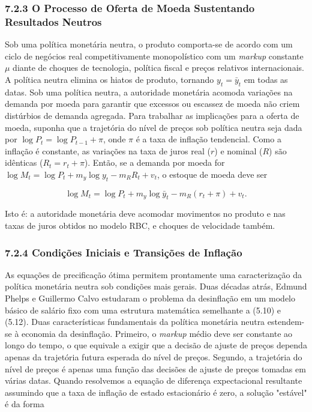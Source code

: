 \documentclass[12pt]{article}
\begin{document}
\subsubsection{7.2.3 O Processo de Oferta de Moeda Sustentando Resultados Neutros} Sob uma política monetária neutra, o produto comporta-se de acordo com um ciclo de negócios real competitivamente monopolístico com um \textit{markup} constante $\mu$ diante de choques de tecnologia, política fiscal e preços relativos internacionais. A política neutra elimina os hiatos de produto, tornando $y_t = \bar{y}_t$ em todas as datas. Sob uma política neutra, a autoridade monetária acomoda variações na demanda por moeda para garantir que excessos ou escassez de moeda não criem distúrbios de demanda agregada. Para trabalhar as implicações para a oferta de moeda, suponha que a trajetória do nível de preços sob política neutra seja dada por $\log P_t = \log P_{t-1} + \pi$, onde $\pi$ é a taxa de inflação tendencial. Como a inflação é constante, as variações na taxa de juros real ($r$) e nominal ($R$) são idênticas ($R_t = r_t + \pi$). Então, se a demanda por moeda for $\log M_t = \log P_t + m_y \log y_t - m_R R_t + v_t$, o estoque de moeda deve ser

\begin{equation}
\log M_t = \log P_t + m_y \log \bar{y}_t - m_R (r_t + \pi) + v_t. \tag{7.1}
\end{equation}

Isto é: a autoridade monetária deve acomodar movimentos no produto e nas taxas de juros obtidos no modelo RBC, e choques de velocidade também.

\subsubsection{7.2.4 Condições Iniciais e Transições de Inflação} As equações de precificação ótima permitem prontamente uma caracterização da política monetária neutra sob condições mais gerais. Duas décadas atrás, Edmund Phelps e Guillermo Calvo estudaram o problema da desinflação em um modelo básico de salário fixo com uma estrutura matemática semelhante a (5.10) e (5.12). Duas características fundamentais da política monetária neutra estendem-se à economia da desinflação. Primeiro, o \textit{markup} médio deve ser constante ao longo do tempo, o que equivale a exigir que a decisão de ajuste de preços dependa apenas da trajetória futura esperada do nível de preços. Segundo, a trajetória do nível de preços é apenas uma função das decisões de ajuste de preços tomadas em várias datas. Quando resolvemos a equação de diferença expectacional resultante assumindo que a taxa de inflação de estado estacionário é zero, a solução "estável" é da forma
\end{document}
